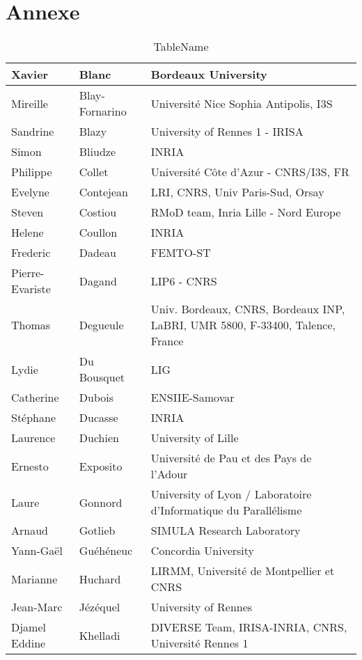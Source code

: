 \section{Annexe}


\begin{table}
\centering
\caption{TableName}
\begin{tabular}{|l|l|l|}
\hline

Xavier & Blanc & Bordeaux University \\ \hline
Mireille & Blay-Fornarino & Université Nice Sophia Antipolis, I3S \\ \hline
Sandrine & Blazy & University of Rennes 1 - IRISA \\ \hline
Simon & Bliudze & INRIA \\ \hline
Philippe & Collet & Université Côte d'Azur - CNRS/I3S, FR \\ \hline
Evelyne & Contejean & LRI, CNRS, Univ Paris-Sud, Orsay \\ \hline
Steven & Costiou & RMoD team, Inria Lille - Nord Europe \\ \hline
Helene & Coullon & INRIA \\ \hline
Frederic & Dadeau & FEMTO-ST \\ \hline
Pierre-Evariste & Dagand & LIP6 - CNRS \\ \hline
Thomas & Degueule & Univ. Bordeaux, CNRS, Bordeaux INP, LaBRI, UMR 5800, F-33400, Talence, France \\ \hline
Lydie & Du Bousquet & LIG \\ \hline
Catherine & Dubois & ENSIIE-Samovar \\ \hline
Stéphane & Ducasse & INRIA \\ \hline
Laurence & Duchien & University of Lille \\ \hline
Ernesto & Exposito & Université de Pau et des Pays de l'Adour \\ \hline
Laure & Gonnord & University of Lyon / Laboratoire d'Informatique du Parallélisme \\ \hline
Arnaud & Gotlieb & SIMULA Research Laboratory \\ \hline
Yann-Gaël & Guéhéneuc & Concordia University \\ \hline
Marianne & Huchard & LIRMM, Université de Montpellier et CNRS \\ \hline
Jean-Marc & Jézéquel & University of Rennes \\ \hline
Djamel Eddine & Khelladi & DIVERSE Team, IRISA-INRIA, CNRS, Université Rennes 1 \\ \hline

\end{tabular}
\end{table}
